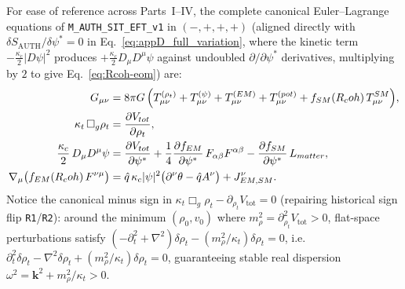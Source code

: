For ease of reference across Parts~I--IV, the complete canonical Euler--Lagrange equations of \texttt{M\_AUTH\_SIT\_EFT\_v1} in $(-,+,+,+)$ (aligned directly with $\delta S_{\mathrm{AUTH}}/\delta\psi^* = 0$ in Eq.~\eqref{eq:appD_full_variation}, where the kinetic term $-\frac{\kappa_c}{2}|D\psi|^2$ produces $+\frac{\kappa_c}{2}D_\mu D^\mu\psi$ against undoubled $\partial/\partial\psi^*$ derivatives, multiplying by $2$ to give Eq.~\eqref{eq:Rcoh-eom}) are:
\begin{align}
G_{\mu\nu} &= 8\pi G\,\Bigl(T_{\mu\nu}^{(\rho_t)} + T_{\mu\nu}^{(\psi)} + T_{\mu\nu}^{(EM)} + T_{\mu\nu}^{(pot)} + f_{SM}(R_coh)\,T_{\mu\nu}^{SM}\Bigr), \label{eq:summary_einstein_sec8}\\
\kappa_t\,\Box_g\rho_t &= \frac{\partial V_{tot}}{\partial\rho_t}, \label{eq:summary_rhot_sec8}\\
\frac{\kappa_c}{2}\,D_\mu D^\mu\psi &= \frac{\partial V_{tot}}{\partial\psi^*}
  + \frac{1}{4}\frac{\partial f_{EM}}{\partial\psi^*}\,F_{\alpha\beta}F^{\alpha\beta}
  - \frac{\partial f_{SM}}{\partial\psi^*}\,L_{matter}, \label{eq:summary_psi_sec8}\\
\nabla_\mu\bigl(f_{EM}(R_coh)\,F^{\nu\mu}\bigr) &= \hat{q}\,\kappa_c|\psi|^2\bigl(\partial^\nu\theta - \hat{q}A^\nu\bigr) + J^\nu_{EM,SM}. \label{eq:summary_maxwell_sec8}
\end{align}
Notice the canonical minus sign in $\kappa_t\Box_g\rho_t - \partial_{\rho_t}V_{\mathrm{tot}} = 0$ (repairing historical sign flip \texttt{R1}/\texttt{R2}): around the minimum $(\rho_0, v_0)$ where $m_\rho^2 = \partial_{\rho_t}^2 V_{\mathrm{tot}} > 0$, flat-space perturbations satisfy $(-\partial_t^2 + \nabla^2)\delta\rho_t - (m_\rho^2/\kappa_t)\delta\rho_t = 0$, i.e.\ $\partial_t^2\delta\rho_t - \nabla^2\delta\rho_t + (m_\rho^2/\kappa_t)\delta\rho_t = 0$, guaranteeing stable real dispersion $\omega^2 = \mathbf{k}^2 + m_\rho^2/\kappa_t > 0$.
